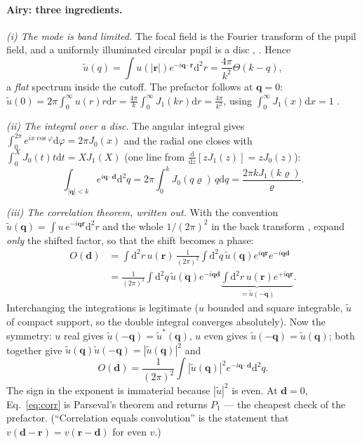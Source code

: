 \documentclass[11pt,a4paper]{article}
\newcommand{\dd}{\mathrm d}
\begin{document}
\paragraph{Airy: three ingredients.}
\emph{(i) The mode is band limited.} The focal field is the Fourier transform
of the pupil field, and a uniformly illuminated circular pupil is a disc
\citep[Ch.~4,~6]{goodman2017}, \citep[Sec.~8.5]{bornwolf1999}. Hence
\begin{equation}
\tilde u(q)=\int u(|\mathbf r|)e^{-i\mathbf q\cdot\mathbf r}\dd^2r
=\frac{4\pi}{k^2}\Theta(k-q),
\end{equation}
a \emph{flat} spectrum inside the cutoff. The prefactor follows at
$\mathbf q=0$: $\tilde u(0)=2\pi\int_0^\infty u(r)r\dd r
=\frac{4\pi}{k}\int_0^\infty J_1(kr)\dd r=\frac{4\pi}{k^2}$, using
$\int_0^\infty J_1(x)\dd x=1$ \citep{dlmf}.

\emph{(ii) The integral over a disc.} The angular integral gives
$\int_0^{2\pi}e^{ix\cos\varphi}\dd\varphi=2\pi J_0(x)$ and the radial one closes
with $\int_0^XJ_0(t)t\dd t=XJ_1(X)$ (one line from
$\tfrac{\dd}{\dd z}[zJ_1(z)]=zJ_0(z)$):
\begin{equation}
\int_{|\mathbf q|<k}e^{i\mathbf q\cdot\mathbf d}\dd^2q
=2\pi\int_0^kJ_0(q\varrho)\,q\dd q=\frac{2\pi k J_1(k\varrho)}{\varrho} .
\label{eq:disc}
\end{equation}

\emph{(iii) The correlation theorem, written out.} With the convention
$\tilde u(\mathbf q)=\int u\,e^{-i\mathbf q\mathbf r}\dd^2r$ and the whole
$1/(2\pi)^2$ in the back transform \citep[Ch.~2]{goodman2017}, expand
\emph{only} the shifted factor, so that the shift becomes a phase:
\begin{align}
O(\mathbf d)&=\int\!\dd^2r\,u(\mathbf r)\,\frac{1}{(2\pi)^2}
\int\!\dd^2q\,\tilde u(\mathbf q)e^{i\mathbf q\mathbf r}e^{-i\mathbf q\mathbf d}\\
&=\frac{1}{(2\pi)^2}\int\!\dd^2q\,\tilde u(\mathbf q)e^{-i\mathbf q\mathbf d}
\underbrace{\int\!\dd^2r\,u(\mathbf r)e^{+i\mathbf q\mathbf r}}_{=\tilde u(-\mathbf q)} .
\end{align}
Interchanging the integrations is legitimate ($u$ bounded and square
integrable, $\tilde u$ of compact support, so the double integral converges
absolutely). Now the symmetry: $u$ real gives
$\tilde u(-\mathbf q)=\tilde u^{*}(\mathbf q)$, $u$ even gives
$\tilde u(-\mathbf q)=\tilde u(\mathbf q)$; both together give
$\tilde u(\mathbf q)\tilde u(-\mathbf q)=|\tilde u(\mathbf q)|^2$ and
\begin{equation}
O(\mathbf d)=\frac{1}{(2\pi)^2}\int|\tilde u(\mathbf q)|^2
e^{-i\mathbf q\cdot\mathbf d}\dd^2q .
\label{eq:corr}
\end{equation}
The sign in the exponent is immaterial because $|\tilde u|^2$ is even. At
$\mathbf d=0$, Eq.~\eqref{eq:corr} is Parseval's theorem and returns $P_1$ ---
the cheapest check of the prefactor. (``Correlation equals convolution'' is the
statement that $v(\mathbf d-\mathbf r)=v(\mathbf r-\mathbf d)$ for even $v$.)
\end{document}
